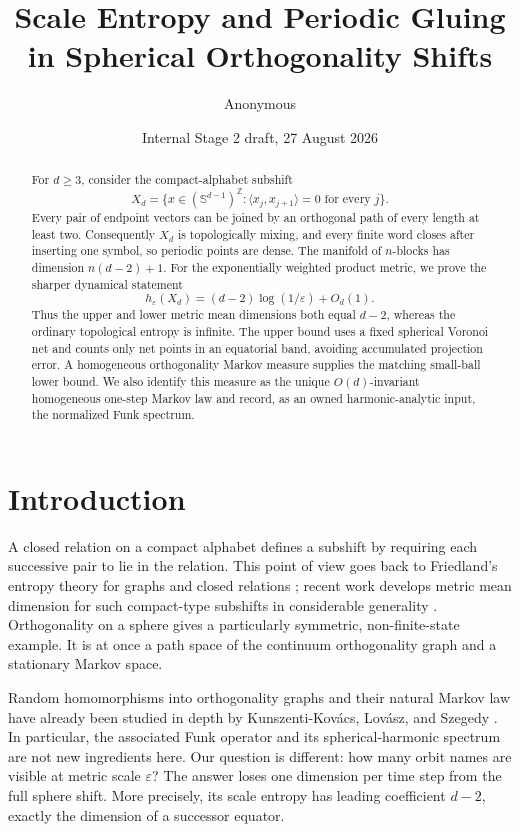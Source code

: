 \documentclass[11pt,a4paper]{amsart}
\title[Spherical orthogonality shifts]{Scale Entropy and Periodic Gluing in Spherical Orthogonality Shifts}
\author{Anonymous}
\date{Internal Stage 2 draft, 27 August 2026}
\theoremstyle{definition}
\theoremstyle{remark}
\newcommand{\Sphere}{\mathbb S}
\newcommand{\Z}{\mathbb Z}
\begin{document}
\begin{abstract}
For $d\geq3$, consider the compact-alphabet subshift
\[
 X_d=\{x\in(\Sphere^{d-1})^{\Z}:\langle x_j,x_{j+1}\rangle=0
       \text{ for every }j\}.
\]
Every pair of endpoint vectors can be joined by an orthogonal path of every
length at least two.  Consequently $X_d$ is topologically mixing, and every
finite word closes after inserting one symbol, so periodic points are dense.
The manifold of $n$-blocks has dimension $n(d-2)+1$.  For the exponentially
weighted product metric, we prove the sharper dynamical statement
\[
 h_\varepsilon(X_d)=(d-2)\log(1/\varepsilon)+O_d(1).
\]
Thus the upper and lower metric mean dimensions both equal $d-2$, whereas the
ordinary topological entropy is infinite.  The upper bound uses a fixed
spherical Voronoi net and counts only net points in an equatorial band,
avoiding accumulated projection error.  A homogeneous orthogonality Markov
measure supplies the matching small-ball lower bound.  We also identify this
measure as the unique $O(d)$-invariant homogeneous one-step Markov law and
record, as an owned harmonic-analytic input, the normalized Funk spectrum.
\end{abstract}

\maketitle

\section{Introduction}

A closed relation on a compact alphabet defines a subshift by requiring each
successive pair to lie in the relation.  This point of view goes back to
Friedland's entropy theory for graphs and closed relations
\cite{Friedland1991}; recent work develops metric mean dimension for such
compact-type subshifts in considerable generality \cite{Pessil2025}.
Orthogonality on a sphere gives a particularly symmetric, non-finite-state
example.  It is at once a path space of the continuum orthogonality graph and
a stationary Markov space.

Random homomorphisms into orthogonality graphs and their natural Markov law
have already been studied in depth by Kunszenti-Kov\'acs, Lov\'asz, and
Szegedy \cite{KunszentiEtAl2024}.  In particular, the associated Funk
operator and its spherical-harmonic spectrum are not new ingredients here.
Our question is different: how many orbit names are visible at metric scale
$\varepsilon$?  The answer loses one dimension per time step from the full
sphere shift.  More precisely, its scale entropy has leading coefficient
$d-2$, exactly the dimension of a successor equator.
\end{document}
